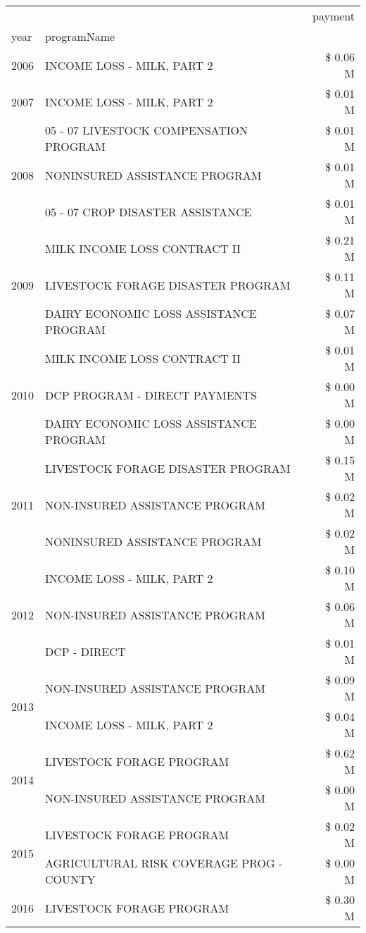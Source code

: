 \begin{tabular}{llr}
\toprule
 &  & payment \\
year & programName &  \\
\midrule
2006 & INCOME LOSS - MILK, PART 2 & \$ 0.06 M \\
\cline{1-3}
2007 & INCOME LOSS - MILK, PART 2 & \$ 0.01 M \\
\cline{1-3}
\multirow[t]{3}{*}{2008} & 05 - 07 LIVESTOCK COMPENSATION PROGRAM & \$ 0.01 M \\
 & NONINSURED ASSISTANCE PROGRAM & \$ 0.01 M \\
 & 05 - 07 CROP DISASTER ASSISTANCE & \$ 0.01 M \\
\cline{1-3}
\multirow[t]{3}{*}{2009} & MILK INCOME LOSS CONTRACT II & \$ 0.21 M \\
 & LIVESTOCK FORAGE DISASTER  PROGRAM & \$ 0.11 M \\
 & DAIRY ECONOMIC LOSS ASSISTANCE PROGRAM & \$ 0.07 M \\
\cline{1-3}
\multirow[t]{3}{*}{2010} & MILK INCOME LOSS CONTRACT II & \$ 0.01 M \\
 & DCP PROGRAM - DIRECT PAYMENTS & \$ 0.00 M \\
 & DAIRY ECONOMIC LOSS ASSISTANCE PROGRAM & \$ 0.00 M \\
\cline{1-3}
\multirow[t]{3}{*}{2011} & LIVESTOCK FORAGE DISASTER PROGRAM & \$ 0.15 M \\
 & NON-INSURED ASSISTANCE PROGRAM & \$ 0.02 M \\
 & NONINSURED ASSISTANCE PROGRAM & \$ 0.02 M \\
\cline{1-3}
\multirow[t]{3}{*}{2012} & INCOME LOSS - MILK, PART 2 & \$ 0.10 M \\
 & NON-INSURED ASSISTANCE PROGRAM & \$ 0.06 M \\
 & DCP - DIRECT & \$ 0.01 M \\
\cline{1-3}
\multirow[t]{2}{*}{2013} & NON-INSURED ASSISTANCE PROGRAM & \$ 0.09 M \\
 & INCOME LOSS - MILK, PART 2 & \$ 0.04 M \\
\cline{1-3}
\multirow[t]{2}{*}{2014} & LIVESTOCK FORAGE PROGRAM & \$ 0.62 M \\
 & NON-INSURED ASSISTANCE PROGRAM & \$ 0.00 M \\
\cline{1-3}
\multirow[t]{2}{*}{2015} & LIVESTOCK FORAGE PROGRAM & \$ 0.02 M \\
 & AGRICULTURAL RISK COVERAGE PROG - COUNTY & \$ 0.00 M \\
\cline{1-3}
2016 & LIVESTOCK FORAGE PROGRAM                      & \$ 0.30 M \\

\end{tabular}
